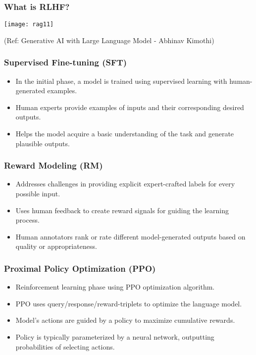 \begin{frame}[fragile]\frametitle{What is RLHF?}


		\begin{center}
		\texttt{[image: rag11]}
		\end{center}

{\tiny (Ref: Generative AI with Large Language Model - Abhinav  Kimothi)}

\end{frame}



\begin{frame}[fragile]\frametitle{Supervised Fine-tuning (SFT)}
\begin{itemize}
    \item In the initial phase, a model is trained using supervised learning with human-generated examples.
    \item Human experts provide examples of inputs and their corresponding desired outputs.
    \item Helps the model acquire a basic understanding of the task and generate plausible outputs.
\end{itemize}
\end{frame}

\begin{frame}[fragile]\frametitle{Reward Modeling (RM)}
\begin{itemize}
    \item Addresses challenges in providing explicit expert-crafted labels for every possible input.
    \item Uses human feedback to create reward signals for guiding the learning process.
    \item Human annotators rank or rate different model-generated outputs based on quality or appropriateness.
\end{itemize}
\end{frame}

\begin{frame}[fragile]\frametitle{Proximal Policy Optimization (PPO)}
\begin{itemize}
    \item Reinforcement learning phase using PPO optimization algorithm.
    \item PPO uses query/response/reward-triplets to optimize the language model.
    \item Model's actions are guided by a policy to maximize cumulative rewards.
    \item Policy is typically parameterized by a neural network, outputting probabilities of selecting actions.
\end{itemize}
\end{frame}

